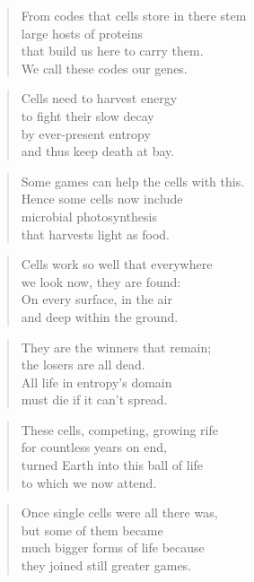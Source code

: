\documentclass[10pt,a4paper]{article}
\begin{document}
\begin{multicols}{2}
\begin{verse}
From codes that cells store in there stem\\
large hosts of proteins\\
that build us here to carry them.\\
We call these codes our genes.
\end{verse}

\begin{verse}
Cells need to harvest energy\\
to fight their slow decay\\
by ever-present entropy\\
and thus keep death at bay.
\end{verse}

\begin{verse}
Some games can help the cells with this.\\
Hence some cells now include\\
microbial photosynthesis\\
that harvests light as food.
\end{verse}

\begin{verse}
Cells work so well that everywhere\\
we look now, they are found:\\
On every surface, in the air\\
and deep within the ground.
\end{verse}

\begin{verse}
They are the winners that remain;\\
the losers are all dead.\\
All life in entropy’s domain\\
must die if it can’t spread.
\end{verse}

\begin{verse}
These cells, competing, growing rife\\
for countless years on end,\\
turned Earth into this ball of life\\
to which we now attend.
\end{verse}

\begin{verse}
Once single cells were all there was,\\
but some of them became\\
much bigger forms of life because\\
they joined still greater games.
\end{verse}


\end{multicols}
\end{document}

